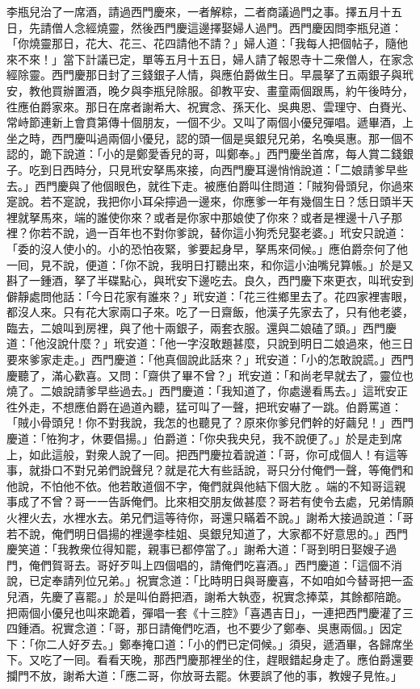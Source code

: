李瓶兒治了一席酒，請過西門慶來，一者解粽，二者商議過門之事。擇五月十五日，先請僧人念經燒靈，然後西門慶這邊擇娶婦人過門。西門慶因問李瓶兒道：「你燒靈那日，花大、花三、花四請他不請？」{}婦人道：「我每人把個帖子，隨他來不來！」當下計議已定，單等五月十五日，婦人請了報恩寺十二衆僧人，在家念經除靈。西門慶那日封了三錢銀子人情，與應伯爵做生日。早晨拏了五兩銀子與玳安，教他買辦置酒，晚夕與李瓶兒除服。卻教平安、畫童兩個跟馬，約午後時分，徃應伯爵家來。那日在席者謝希大、祝實念、孫天化、吳典恩、雲理守、白賚光、常峙節連新上會賁第傳十個朋友，一個不少。{}又叫了兩個小優兒彈唱。遞畢酒，上坐之時，西門慶叫過兩個小優兒，認的頭一個是吳銀兒兄弟，名喚吳惠。那一個不認的，{}跪下說道：「小的是鄭愛香兒的哥，叫鄭奉。」西門慶坐首席，每人賞二錢銀子。吃到日西時分，只見玳安拏馬來接，向西門慶耳邊悄悄說道：「二娘請爹早些去。」西門慶與了他個眼色，就徃下走。{}被應伯爵叫住問道：「賊狗骨頭兒，你過來寔說。若不寔說，我把你小耳朵擰過一邊來，你應爹一年有幾個生日？恁日頭半天裡就拏馬來，端的誰使你來？或者是你家中那娘使了你來？或者是裡邊十八子那裡？你若不說，過一百年也不對你爹說，替你這小狗禿兒娶老婆。」玳安只說道：「委的沒人使小的。小的恐怕夜緊，爹要起身早，拏馬來伺候。」應伯爵奈何了他一囘，見不說，便道：「你不說，我明日打聽出來，和你這小油嘴兒算帳。」於是又斟了一鍾酒，拏了半碟點心，與玳安下邊吃去。良久，西門慶下來更衣，叫玳安到僻靜處問他話：「今日花家有誰來？」{}玳安道：「花三徃鄉里去了。花四家裡害眼，都沒人來。只有花大家兩口子來。吃了一日齋飯，他漢子先家去了，只有他老婆，臨去，二娘叫到房裡，與了他十兩銀子，兩套衣服。還與二娘磕了頭。」西門慶道：「他沒說什麼？」玳安道：「他一字沒敢題甚麼，只說到明日二娘過來，他三日要來爹家走走。」西門慶道：「他真個說此話來？」{}玳安道：「小的怎敢說謊。」西門慶聽了，滿心歡喜。又問：「齋供了畢不曾？」玳安道：「和尚老早就去了，靈位也燒了。二娘說請爹早些過去。」西門慶道：「我知道了，你處邊看馬去。」這玳安正徃外走，不想應伯爵在過道內聽，猛可叫了一聲，把玳安嚇了一跳。伯爵罵道：「賊小骨頭兒！你不對我說，我怎的也聽見了？原來你爹兒們幹的好繭兒！」西門慶道：「恠狗才，休要倡揚。」伯爵道：「你央我央兒，我不說便了。」於是走到席上，如此這般，對衆人說了一囘。把西門慶拉着說道：「哥，你可成個人！有這等事，就掛口不對兄弟們說聲兒？就是花大有些話說，哥只分付俺們一聲，等俺們和他說，不怕他不依。他若敢道個不字，俺們就與他結下個大肐𦞂。端的不知哥這親事成了不曾？哥一一告訴俺們。比來相交朋友做甚麼？哥若有使令去處，兄弟情願火裡火去，水裡水去。弟兄們這等待你，哥還只瞞着不說。」{}謝希大接過說道：「哥若不說，俺們明日倡揚的裡邊李桂姐、吳銀兒知道了，大家都不好意思的。」西門慶笑道：「我教衆位得知罷，親事已都停當了。」謝希大道：「哥到明日娶嫂子過門，俺們賀哥去。哥好歹叫上四個唱的，請俺們吃喜酒。」西門慶道：「這個不消說，已定奉請列位兄弟。」祝實念道：「比時明日與哥慶喜，不如咱如今替哥把一盃兒酒，先慶了喜罷。」{}於是叫伯爵把酒，謝希大執壺，祝實念捧菜，其餘都陪跪。把兩個小優兒也叫來跪着，彈唱一套《十三腔》「喜遇吉日」，一連把西門慶灌了三四鍾酒。祝實念道：「哥，那日請俺們吃酒，也不要少了鄭奉、吳惠兩個。」因定下：「你二人好歹去。」鄭奉掩口道：「小的們已定伺候。」須臾，遞酒畢，各歸席坐下。又吃了一囘。看看天晚，那西門慶那裡坐的住，趕眼錯起身走了。應伯爵還要攔門不放，謝希大道：「應二哥，你放哥去罷。休要誤了他的事，教嫂子見恠。」

